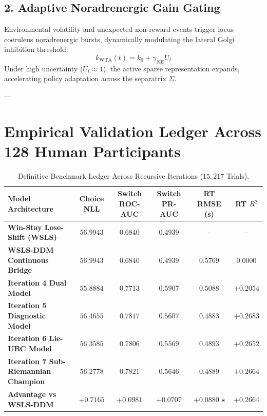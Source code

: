 \documentclass[11pt,a4paper]{article}
\begin{document}
\subsection{2. Adaptive Noradrenergic Gain Gating}
Environmental volatility and unexpected non-reward events trigger locus coeruleus noradrenergic bursts, dynamically modulating the lateral Golgi inhibition threshold:
\begin{equation}
k_{\text{WTA}}(t) = k_0 + \gamma_{NE} U_t
\end{equation}
Under high uncertainty ($U_t \approx 1$), the active sparse representation expands, accelerating policy adaptation across the separatrix $\Sigma$.

---

\section{Empirical Validation Ledger Across 128 Human Participants}

\begin{table}[H]
\centering
\caption{Definitive Benchmark Ledger Across Recursive Iterations ($15,217$ Trials).}
\label{tab:iteration7_ledger}
\vspace{0.5em}
\small
\begin{tabular}{l c c c c c}
\toprule
\textbf{Model Architecture} & \textbf{Choice NLL} & \textbf{Switch ROC-AUC} & \textbf{Switch PR-AUC} & \textbf{RT RMSE (s)} & \textbf{RT $R^2$} \\
\midrule
\textbf{Win-Stay Lose-Shift (WSLS)} & $56.9943$ & $0.6840$ & $0.4939$ & -- & -- \\
\textbf{WSLS-DDM Continuous Bridge} & $56.9943$ & $0.6840$ & $0.4939$ & $0.5769$ & $0.0000$ \\
\textbf{Iteration 4 Dual Model} & $55.8884$ & $0.7713$ & $0.5907$ & $0.5088$ & $+0.2054$ \\
\textbf{Iteration 5 Diagnostic Model} & $56.4655$ & $0.7817$ & $0.5607$ & $0.4883$ & $+0.2683$ \\
\textbf{Iteration 6 Lie-UBC Model} & $56.3585$ & $0.7806$ & $0.5569$ & $0.4893$ & $+0.2652$ \\
\midrule
\textbf{Iteration 7 Sub-Riemannian Champion} & $\mathbf{56.2778}$ & $\mathbf{0.7821}$ & $\mathbf{0.5646}$ & $\mathbf{0.4889}$ & $\mathbf{+0.2664}$ \\
\midrule
\textbf{Advantage vs WSLS-DDM} & $\mathbf{+0.7165}$ & $\mathbf{+0.0981}$ & $\mathbf{+0.0707}$ & $\mathbf{+0.0880\text{ s}}$ & $\mathbf{+0.2664}$ \\
\bottomrule
\end{tabular}
\end{table}
\end{document}

